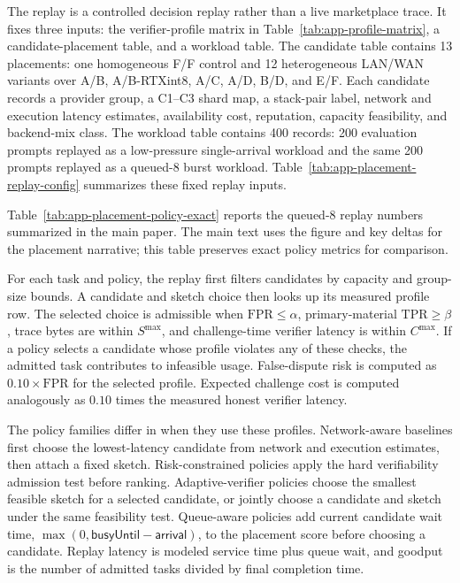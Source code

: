 \documentclass[sigplan,screen,review,anonymous]{acmart}
\begin{document}
The replay is a controlled decision replay rather than a live marketplace
trace. It fixes three inputs: the verifier-profile matrix in
Table~\ref{tab:app-profile-matrix}, a candidate-placement table, and a workload
table. The candidate table contains 13 placements: one homogeneous F/F control
and 12 heterogeneous LAN/WAN variants over A/B, A/B-RTXint8, A/C, A/D, B/D,
and E/F. Each candidate records a provider group, a C1--C3 shard map, a
stack-pair label, network and execution latency estimates, availability cost,
reputation, capacity feasibility, and backend-mix class. The workload table
contains 400 records: 200 evaluation prompts replayed as a low-pressure
single-arrival workload and the same 200 prompts replayed as a queued-8 burst
workload. Table~\ref{tab:app-placement-replay-config} summarizes these fixed
replay inputs.


Table~\ref{tab:app-placement-policy-exact} reports the queued-8 replay numbers
summarized in the main paper. The main text uses the figure and key deltas for
the placement narrative; this table preserves exact policy metrics for
comparison.


For each task and policy, the replay first filters candidates by capacity and
group-size bounds. A candidate and sketch choice then looks up its measured
profile row. The selected choice is admissible when
\(\mathrm{FPR}\le\alpha\), primary-material \(\mathrm{TPR}\ge\beta\), trace
bytes are within \(S^{\max}\), and challenge-time verifier latency is within
\(C^{\max}\). If a policy selects a candidate whose profile violates any of
these checks, the admitted task contributes to infeasible usage. False-dispute
risk is computed as \(0.10\times\mathrm{FPR}\) for the selected profile.
Expected challenge cost is computed analogously as \(0.10\) times the measured
honest verifier latency.

The policy families differ in when they use these profiles. Network-aware
baselines first choose the lowest-latency candidate from network and execution
estimates, then attach a fixed sketch. Risk-constrained policies apply the
hard verifiability admission test before ranking. Adaptive-verifier policies
choose the smallest feasible sketch for a selected candidate, or jointly choose
a candidate and sketch under the same feasibility test. Queue-aware policies
add current candidate wait time,
\(\max(0,\mathsf{busyUntil}-\mathsf{arrival})\), to the placement score before
choosing a candidate. Replay latency is modeled service time plus queue wait,
and goodput is the number of admitted tasks divided by final completion time.
\end{document}
